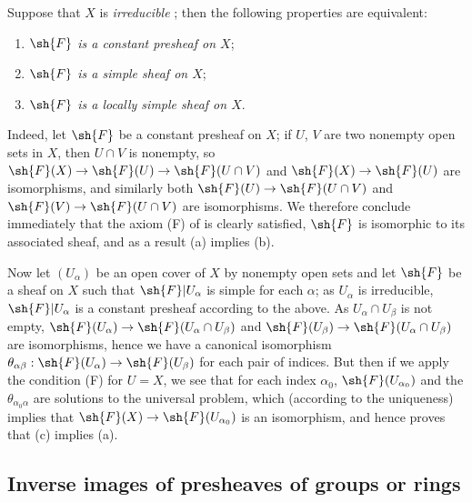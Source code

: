 \begin{env}[3.6.2]
\label{0.3.6.2}
Suppose that $X$ is \emph{irreducible} ; then the following
properties are equivalent:
\begin{enumerate}[label=(\alph*)]
  \item \emph{$\sh{F}$ is a constant presheaf on $X$};
  \item \emph{$\sh{F}$ is a simple sheaf on $X$};
  \item \emph{$\sh{F}$ is a locally simple sheaf on $X$}.
\end{enumerate}

Indeed, let $\sh{F}$ be a constant presheaf on $X$; if $U$, $V$ are two nonempty
open sets in $X$, then $U\cap V$ is nonempty, so
$\sh{F}(X)\to\sh{F}(U)\to\sh{F}(U\cap V)$ and $\sh{F}(X)\to\sh{F}(U)$ are
isomorphisms, and similarly both $\sh{F}(U)\to\sh{F}(U\cap V)$ and
$\sh{F}(V)\to\sh{F}(U\cap V)$ are isomorphisms. We therefore conclude
immediately that the axiom (F) of  is clearly satisfied,
$\sh{F}$ is isomorphic to its associated sheaf, and as a result (a) implies (b).

Now let $(U_\alpha)$ be an open cover of $X$ by nonempty open sets and let
$\sh{F}$ be a sheaf on $X$ such that $\sh{F}|U_\alpha$ is simple for each
$\alpha$; as $U_\alpha$ is irreducible, $\sh{F}|U_\alpha$ is a constant presheaf
according to the above. As $U_\alpha\cap U_\beta$ is not empty,
$\sh{F}(U_\alpha)\to\sh{F}(U_\alpha\cap U_\beta)$ and
$\sh{F}(U_\beta)\to\sh{F}(U_\alpha\cap U_\beta)$ are isomorphisms, hence we have
a canonical isomorphism
$\theta_{\alpha\beta}:\sh{F}(U_\alpha)\to\sh{F}(U_\beta)$ for each pair of
indices. But then if we apply the condition (F) for $U=X$, we see that for each
index $\alpha_0$, $\sh{F}(U_{\alpha_0})$ and the $\theta_{\alpha_0\alpha}$ are
solutions to the universal problem, which (according to the uniqueness) implies
that $\sh{F}(X)\to\sh{F}(U_{\alpha_0})$ is an isomorphism, and hence proves that
(c) implies (a).
\end{env}

\subsection{Inverse images of presheaves of groups or rings}
\label{subsection:inverse-images-of-psh-grps-or-rings}


